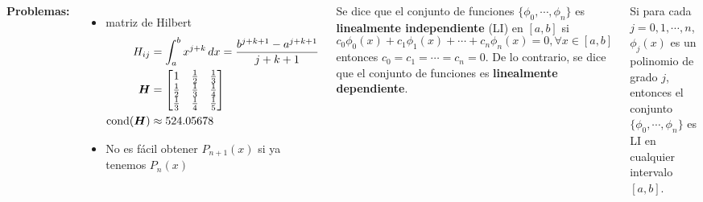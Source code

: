 \documentclass[9pt, aspectratio=169]{beamer}
\begin{document}
\begin{frame}
    \begin{columns}[t]
\textbf{Problemas:}
\begin{itemize}
\item matriz de Hilbert
\begin{align*}
    H_{ij} &= \int_a^b x^{j+k} \, dx = \frac{b^{j+k+1} - a^{j+k+1}}{j + k + 1} \\
    \bm{H} &= \begin{bmatrix}
        1 & \frac{1}{2} & \frac{1}{3} \\
        \frac{1}{2}& \frac{1}{3} & \frac{1}{4} \\
        \frac{1}{3}& \frac{1}{4} & \frac{1}{5} \\
    \end{bmatrix} \\
        \operatorname{cond}(\bm{H}) &\approx 524.05678
\end{align*} \pause
\item No es fácil obtener $P_{n+1}(x)$ si ya tenemos $P_n(x)$
\end{itemize} \pause

\begin{definition}
Se dice que el conjunto de funciones $\{ \phi_0, \cdots, \phi_n \}$ es \textbf{linealmente independiente} (LI) en $[a, b]$ si
\[ c_0 \phi_0(x) + c_1 \phi_1(x) + \cdots + c_n \phi_n(x) = 0, \forall x \in [a, b] \]
entonces $c_0 = c_1 = \cdots = c_n = 0$. De lo contrario, se dice que el conjunto de funciones es \textbf{linealmente dependiente}.
\end{definition}  \pause

\begin{theorem}[Polinomios LI]
    Si para cada $j = 0, 1, \cdots, n$, $\phi_j(x)$ es un polinomio de grado $j$, entonces el conjunto $\{ \phi_0, \cdots, \phi_n \}$ es LI en cualquier intervalo $[a, b]$.
\end{theorem}

\end{columns}
\end{frame}
\end{document}

